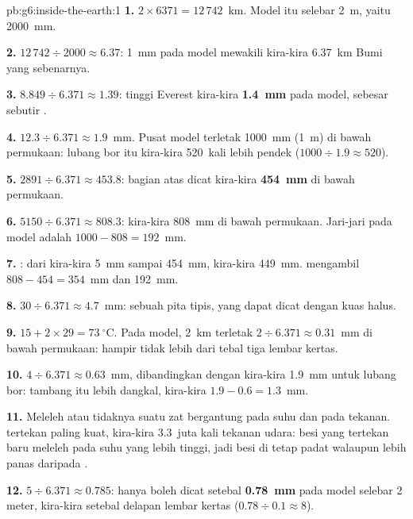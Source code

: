 \begin{solution}{pb:g6:inside-the-earth:1}
\textbf{1.} $2 \times 6371 = 12\,742$~km. Model itu selebar 2~m, yaitu
2000~mm.

\textbf{2.} $12\,742 \div 2000 \approx 6.37$: 1~mm pada model mewakili
kira-kira 6.37~km Bumi yang sebenarnya.

\textbf{3.} $8.849 \div 6.371 \approx 1.39$: tinggi Everest kira-kira
\textbf{1.4~mm} pada model, sebesar sebutir .

\textbf{4.} $12.3 \div 6.371 \approx 1.9$~mm. Pusat model terletak 1000~mm
(1~m) di bawah permukaan: lubang bor itu kira-kira 520~kali lebih pendek
($1000 \div 1.9 \approx 520$).

\textbf{5.} $2891 \div 6.371 \approx 453.8$: bagian atas  dicat
kira-kira \textbf{454~mm} di bawah permukaan.

\textbf{6.} $5150 \div 6.371 \approx 808.3$: kira-kira 808~mm di bawah
permukaan. Jari-jari  pada model adalah $1000 - 808 = 192$~mm.

\textbf{7.} : dari kira-kira 5~mm sampai 454~mm, kira-kira 449~mm.  mengambil $808 - 454 = 354$~mm dan  192~mm.

\textbf{8.} $30 \div 6.371 \approx 4.7$~mm: sebuah pita tipis, yang dapat
dicat dengan kuas halus.

\textbf{9.} $15 + 2 \times 29 = 73~^\circ$C. Pada model, 2~km terletak
$2 \div 6.371 \approx 0.31$~mm di bawah permukaan: hampir tidak lebih dari
tebal tiga lembar kertas.

\textbf{10.} $4 \div 6.371 \approx 0.63$~mm, dibandingkan dengan kira-kira
1.9~mm untuk lubang bor: tambang itu lebih dangkal, kira-kira
$1.9 - 0.6 = 1.3$~mm.

\textbf{11.} Meleleh atau tidaknya suatu zat bergantung pada suhu dan pada
tekanan.  tertekan paling kuat, kira-kira 3.3~juta kali tekanan
udara: besi yang tertekan baru meleleh pada suhu yang lebih tinggi, jadi
besi di  tetap padat walaupun lebih panas daripada .

\textbf{12.} $5 \div 6.371 \approx 0.785$:   hanya boleh dicat
setebal \textbf{0.78~mm} pada model selebar 2 meter, kira-kira setebal
delapan lembar kertas ($0.78 \div 0.1 \approx 8$).
\end{solution}
